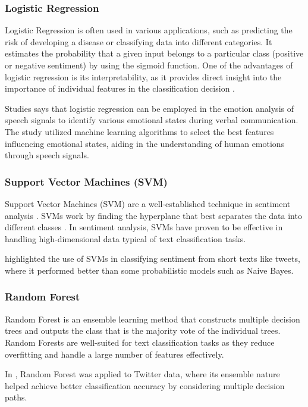 \subsubsection{Logistic Regression}

Logistic Regression is often used in various applications, such as predicting the risk of developing a disease or classifying data into different categories. It estimates the probability that a given input belongs to a particular class (positive or negative sentiment) by using the sigmoid function. One of the advantages of logistic regression is its interpretability, as it provides direct insight into the importance of individual features in the classification decision \cite{Pathan2018}.

Studies says that logistic regression can be employed in the emotion analysis of speech signals to identify various emotional states during verbal communication. The study utilized machine learning algorithms to select the best features influencing emotional states, aiding in the understanding of human emotions through speech signals\cite{Poovammal2016}.

\subsubsection{Support Vector Machines (SVM)}

Support Vector Machines (SVM) are a well-established technique in sentiment analysis \cite{Mahmood2020}. SVMs work by finding the hyperplane that best separates the data into different classes \cite{Gillet2007}. In sentiment analysis, SVMs have proven to be effective in handling high-dimensional data typical of text classification tasks.

\cite{Wang2012} highlighted the use of SVMs in classifying sentiment from short texts like tweets, where it performed better than some probabilistic models such as Naive Bayes.

\subsubsection{Random Forest}

Random Forest is an ensemble learning method that constructs multiple decision trees and outputs the class that is the majority vote of the individual trees. Random Forests are well-suited for text classification tasks as they reduce overfitting and handle a large number of features effectively.

In \cite{Go2009}, Random Forest was applied to Twitter data, where its ensemble nature helped achieve better classification accuracy by considering multiple decision paths.


